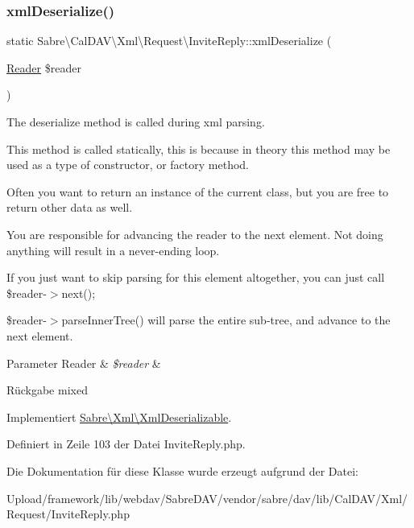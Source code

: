 \subsubsection{\texorpdfstring{xml\+Deserialize()}{xmlDeserialize()}}
{\footnotesize\ttfamily static Sabre\textbackslash{}\+Cal\+D\+A\+V\textbackslash{}\+Xml\textbackslash{}\+Request\textbackslash{}\+Invite\+Reply\+::xml\+Deserialize (\begin{DoxyParamCaption}\item[{\mbox{\hyperlink{class_sabre_1_1_xml_1_1_reader}{Reader}}}]{\$reader }\end{DoxyParamCaption})\hspace{0.3cm}{\ttfamily [static]}}

The deserialize method is called during xml parsing.

This method is called statically, this is because in theory this method may be used as a type of constructor, or factory method.

Often you want to return an instance of the current class, but you are free to return other data as well.

You are responsible for advancing the reader to the next element. Not doing anything will result in a never-\/ending loop.

If you just want to skip parsing for this element altogether, you can just call \$reader-\/$>$next();

\$reader-\/$>$parse\+Inner\+Tree() will parse the entire sub-\/tree, and advance to the next element.


\begin{DoxyParams}[1]{Parameter}
Reader & {\em \$reader} & \\
\hline
\end{DoxyParams}
\begin{DoxyReturn}{Rückgabe}
mixed 
\end{DoxyReturn}


Implementiert \mbox{\hyperlink{interface_sabre_1_1_xml_1_1_xml_deserializable_a19e0eca545b9a0d93f7d6b69085ade30}{Sabre\textbackslash{}\+Xml\textbackslash{}\+Xml\+Deserializable}}.



Definiert in Zeile 103 der Datei Invite\+Reply.\+php.



Die Dokumentation für diese Klasse wurde erzeugt aufgrund der Datei\+:\begin{DoxyCompactItemize}
\item 
Upload/framework/lib/webdav/\+Sabre\+D\+A\+V/vendor/sabre/dav/lib/\+Cal\+D\+A\+V/\+Xml/\+Request/Invite\+Reply.\+php\end{DoxyCompactItemize}
